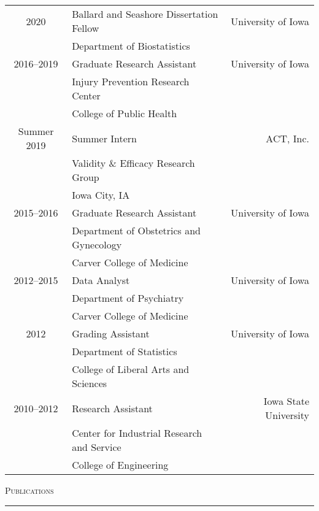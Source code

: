 \documentclass[a4paper]{article}
\begin{document}
\begin{tabular*}{0.95\textwidth}{@{\extracolsep{\fill}}clr}
  2020 & Ballard and Seashore Dissertation Fellow & University of Iowa \\
    & Department of Biostatistics & \\[3pt]
  2016--2019 & Graduate Research Assistant & University of Iowa \\
   & Injury Prevention Research Center & \\
   & College of Public Health & \\[3pt]
  Summer 2019 & Summer Intern & ACT, Inc. \\
    & Validity \& Efficacy Research Group & \\
    & Iowa City, IA & \\[3pt]
  2015--2016 & Graduate Research Assistant & University of Iowa \\
   & Department of Obstetrics and Gynecology & \\
   & Carver College of Medicine & \\
  2012--2015 & Data Analyst & University of Iowa \\
   & Department of Psychiatry & \\
   & Carver College of Medicine & \\[3pt]
  2012 & Grading Assistant & University of Iowa \\
   & Department of Statistics & \\
   & College of Liberal Arts and Sciences & \\[3pt]
  2010--2012 & Research Assistant & Iowa State University \\
   & Center for Industrial Research and Service \\
   & College of Engineering &
\end{tabular*}
\vspace{0.25\baselineskip}


\begin{flushleft}
  \Large\textsc{Publications}
  \textcolor{usafagrey}{\rule[0.5\baselineskip]{\textwidth}{0.75pt}}
\end{flushleft}
\vspace{-1.5\baselineskip}
\end{document}
